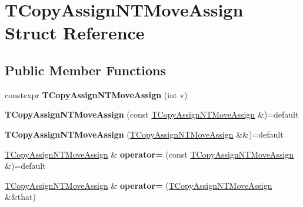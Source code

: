 \hypertarget{struct_t_copy_assign_n_t_move_assign}{}\section{T\+Copy\+Assign\+N\+T\+Move\+Assign Struct Reference}
\label{struct_t_copy_assign_n_t_move_assign}
\subsection*{Public Member Functions}
\begin{DoxyCompactItemize}
\item 
\mbox{\label{struct_t_copy_assign_n_t_move_assign_abfb472471a58247c89d8f51e52205545}} 
constexpr {\bfseries T\+Copy\+Assign\+N\+T\+Move\+Assign} (int v)
\item 
\mbox{\label{struct_t_copy_assign_n_t_move_assign_a17fadf206f046aaa2876b4bb05f0bf51}} 
{\bfseries T\+Copy\+Assign\+N\+T\+Move\+Assign} (const \mbox{\hyperlink{struct_t_copy_assign_n_t_move_assign}{T\+Copy\+Assign\+N\+T\+Move\+Assign}} \&)=default
\item 
\mbox{\label{struct_t_copy_assign_n_t_move_assign_a135720546a08ee512bb93815802a2d0e}} 
{\bfseries T\+Copy\+Assign\+N\+T\+Move\+Assign} (\mbox{\hyperlink{struct_t_copy_assign_n_t_move_assign}{T\+Copy\+Assign\+N\+T\+Move\+Assign}} \&\&)=default
\item 
\mbox{\label{struct_t_copy_assign_n_t_move_assign_a6c6f6ad585f49b03211c386e91b62026}} 
\mbox{\hyperlink{struct_t_copy_assign_n_t_move_assign}{T\+Copy\+Assign\+N\+T\+Move\+Assign}} \& {\bfseries operator=} (const \mbox{\hyperlink{struct_t_copy_assign_n_t_move_assign}{T\+Copy\+Assign\+N\+T\+Move\+Assign}} \&)=default
\item 
\mbox{\label{struct_t_copy_assign_n_t_move_assign_a1b394178ec15fabdb202f50663eb94a6}} 
\mbox{\hyperlink{struct_t_copy_assign_n_t_move_assign}{T\+Copy\+Assign\+N\+T\+Move\+Assign}} \& {\bfseries operator=} (\mbox{\hyperlink{struct_t_copy_assign_n_t_move_assign}{T\+Copy\+Assign\+N\+T\+Move\+Assign}} \&\&that)
\end{DoxyCompactItemize}
